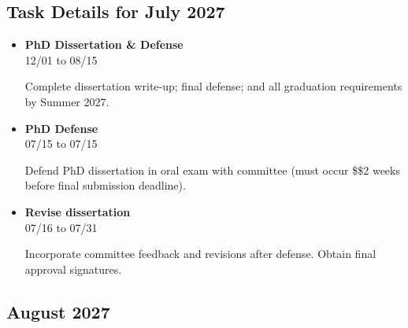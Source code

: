 \documentclass[landscape,a4paper]{article}
\begin{document}
\vspace{0.5cm}
\subsection{Task Details for July 2027}
\begin{itemize}[leftmargin=1cm, itemsep=0.8em]
    \item \textcolor{other}{\textbf{PhD Dissertation \& Defense}}\\[0.2em]
          \textcolor{black!70}{\small 12/01 to 08/15}
\\[0.3em]
          \begin{minipage}[t]{0.85\textwidth}
          \textcolor{black!80}{Complete dissertation write-up; final defense; and all graduation requirements by Summer 2027.}
          \end{minipage}

    \item \textcolor{other}{\textbf{PhD Defense}}\\[0.2em]
          \textcolor{black!70}{\small 07/15 to 07/15}
\\[0.3em]
          \begin{minipage}[t]{0.85\textwidth}
          \textcolor{black!80}{Defend PhD dissertation in oral exam with committee (must occur \$\geq\$2 weeks\\[0.1em]
          before final submission deadline).}
          \end{minipage}

    \item \textcolor{other}{\textbf{Revise dissertation}}\\[0.2em]
          \textcolor{black!70}{\small 07/16 to 07/31}
\\[0.3em]
          \begin{minipage}[t]{0.85\textwidth}
          \textcolor{black!80}{Incorporate committee feedback and revisions after defense. Obtain final approval signatures.}
          \end{minipage}

\end{itemize}

\subsection*{August 2027}
\vspace{0.5cm}
\end{document}
